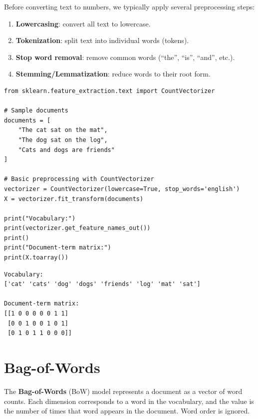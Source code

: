 \begin{definition}
Before converting text to numbers, we typically apply several preprocessing steps:
\begin{enumerate}
    \item \textbf{Lowercasing}: convert all text to lowercase.
    \item \textbf{Tokenization}: split text into individual words (tokens).
    \item \textbf{Stop word removal}: remove common words (``the'', ``is'', ``and'', etc.).
    \item \textbf{Stemming/Lemmatization}: reduce words to their root form.
\end{enumerate}
\end{definition}

\begin{codeblock}[title=\textbf{Python}]
\begin{verbatim}
from sklearn.feature_extraction.text import CountVectorizer

# Sample documents
documents = [
    "The cat sat on the mat",
    "The dog sat on the log",
    "Cats and dogs are friends"
]

# Basic preprocessing with CountVectorizer
vectorizer = CountVectorizer(lowercase=True, stop_words='english')
X = vectorizer.fit_transform(documents)

print("Vocabulary:")
print(vectorizer.get_feature_names_out())
print()
print("Document-term matrix:")
print(X.toarray())
\end{verbatim}
\end{codeblock}

\begin{codeoutput}
\begin{verbatim}
Vocabulary:
['cat' 'cats' 'dog' 'dogs' 'friends' 'log' 'mat' 'sat']

Document-term matrix:
[[1 0 0 0 0 0 1 1]
 [0 0 1 0 0 1 0 1]
 [0 1 0 1 1 0 0 0]]
\end{verbatim}
\end{codeoutput}

\section{Bag-of-Words}
\label{sec:bow}


\begin{definition}
The \textbf{Bag-of-Words} (BoW) model represents a document as a vector of word counts. Each dimension corresponds to a word in the vocabulary, and the value is the number of times that word appears in the document. Word order is ignored.
\end{definition}


